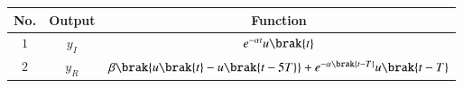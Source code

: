 \begin{tabular}{|c|c|c|}
	\hline
	\textbf{No.} & \textbf{Output} & \textbf{Function}\\[6pt]
	\hline
	$1$ & $y_I$  & $e^{- \alpha t} u\brak{t}$\\[2pt]
	\hline
	$2$ & $y_R$ & $\beta \brak{ u\brak{t} - u\brak{t-5T}} + e^{- \alpha \brak{t - T}} u\brak{t-T}$\\[2pt]
	\hline
\end{tabular}